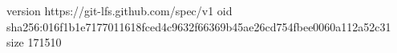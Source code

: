 version https://git-lfs.github.com/spec/v1
oid sha256:016f1b1e7177011618fced4c9632f66369b45ae26cd754fbee0060a112a52c31
size 171510
